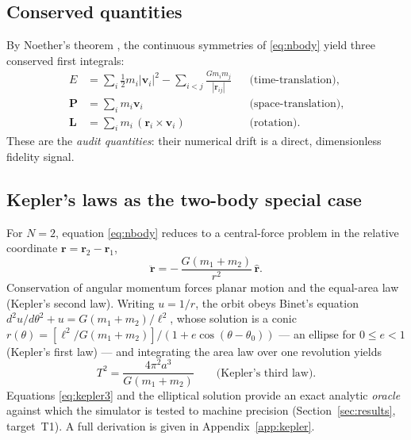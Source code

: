\documentclass[11pt]{article}
\theoremstyle{definition}
\begin{document}
\subsection{Conserved quantities}
By Noether's theorem \cite{noether1918}, the continuous symmetries of
\eqref{eq:nbody} yield three conserved first integrals:
\begin{align}
E &= \sum_i \tfrac12 m_i |\mathbf v_i|^2
   - \sum_{i<j} \frac{G m_i m_j}{|\mathbf r_{ij}|}
   && \text{(time-translation)},\\
\mathbf P &= \sum_i m_i \mathbf v_i && \text{(space-translation)},\\
\mathbf L &= \sum_i m_i\,(\mathbf r_i \times \mathbf v_i)
   && \text{(rotation)}.
\end{align}
These are the \emph{audit quantities}: their numerical drift is a direct,
dimensionless fidelity signal.

\subsection{Kepler's laws as the two-body special case}
\label{sec:kepler}
For $N=2$, equation \eqref{eq:nbody} reduces to a central-force problem in the
relative coordinate $\mathbf r = \mathbf r_2 - \mathbf r_1$,
\begin{equation}
\ddot{\mathbf r} = -\,\frac{G(m_1+m_2)}{r^2}\,\hat{\mathbf r}.
\end{equation}
Conservation of angular momentum forces planar motion and the equal-area law
(Kepler's second law). Writing $u = 1/r$, the orbit obeys Binet's equation
$d^2u/d\theta^2 + u = G(m_1+m_2)/\ell^2$, whose solution is a conic
$r(\theta) = [\ell^2/G(m_1+m_2)]/(1 + e\cos(\theta-\theta_0))$ --- an ellipse for
$0 \le e < 1$ (Kepler's first law) --- and integrating the area law over one
revolution yields
\begin{equation}
\label{eq:kepler3}
T^2 = \frac{4\pi^2 a^3}{G(m_1+m_2)}
\qquad\text{(Kepler's third law).}
\end{equation}
Equations \eqref{eq:kepler3} and the elliptical solution provide an exact
analytic \emph{oracle} against which the simulator is tested to machine
precision (Section~\ref{sec:results}, target~T1). A full derivation is given in
Appendix~\ref{app:kepler}.
\end{document}
